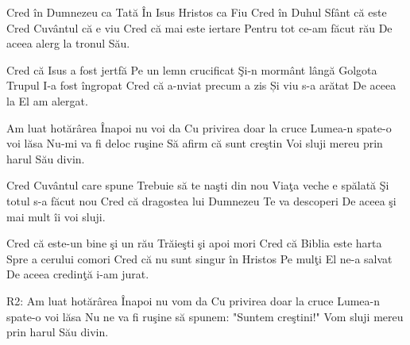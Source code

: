 
\beginverse
Cred în Dumnezeu ca Tată
În Isus Hristos ca Fiu
Cred în Duhul Sfânt că este
Cred Cuvântul că e viu
Cred că mai este iertare
Pentru tot ce-am făcut rău
De aceea alerg la tronul Său.
\endverse

\beginverse
Cred că Isus a fost jertfă
Pe un lemn crucificat
Şi-n mormânt lângă Golgota
Trupul I-a fost îngropat
Cred că a-nviat precum a zis
Și viu s-a arătat
De aceea la El am alergat.
\endverse

\beginchorus
Am luat hotărârea
Înapoi nu voi da
Cu privirea doar la cruce
Lumea-n spate-o voi lăsa
Nu-mi va fi deloc ruşine
Să afirm că sunt creştin
Voi sluji mereu prin harul Său divin.
\endchorus

\beginverse
Cred Cuvântul care spune
Trebuie să te naşti din nou
Viaţa veche e spălată
Şi totul s-a făcut nou
Cred că dragostea lui Dumnezeu
Te va descoperi
De aceea şi mai mult îi voi sluji.
\endverse

\beginverse
Cred că este-un bine şi un rău
Trăieşti şi apoi mori
Cred că Biblia este harta
Spre a cerului comori
Cred că nu sunt singur în Hristos
Pe mulţi El ne-a salvat
De aceea credinţă i-am jurat.
\endverse

\beginchorus
R2: Am luat hotărârea
Înapoi nu vom da
Cu privirea doar la cruce
Lumea-n spate-o voi lăsa
Nu ne va fi ruşine să spunem: "Suntem creştini!"
Vom sluji mereu prin harul Său divin.
\endchorus

\endsong